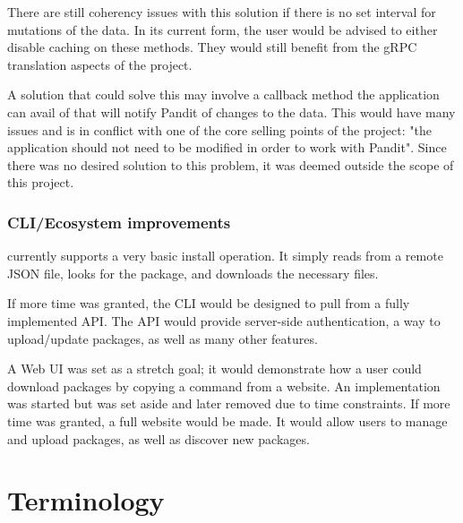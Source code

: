 \documentclass[a4paper,12pt]{report}
\begin{document}
There are still coherency issues with this solution if there is no set interval for mutations of the data.
In its current form, the user would be advised to either disable caching on these methods. They would still benefit from the gRPC translation aspects of the project.

A solution that could solve this may involve a callback method the application can avail of that will notify Pandit of changes to the data.
This would have many issues and is in conflict with one of the core selling points of the project: "the application should not need to be modified in order to work with Pandit".
Since there was no desired solution to this problem, it was deemed outside the scope of this project.

\subsection{CLI/Ecosystem improvements}
 currently supports a very basic install operation. 
It simply reads from a remote JSON file, looks for the package, and downloads the necessary files.

If more time was granted, the CLI would be designed to pull from a fully implemented API. 
The API would provide server-side authentication, a way to upload/update packages, as well as many other features.

A Web UI was set as a stretch goal; it would demonstrate how a user could download packages by copying a command from a website.
An implementation was started but was set aside and later removed due to time constraints. 
If more time was granted, a full website would be made.
It would allow users to manage and upload packages, as well as discover new packages.


\medskip

\chapter*{Terminology}

\printbibliography
\end{document}
